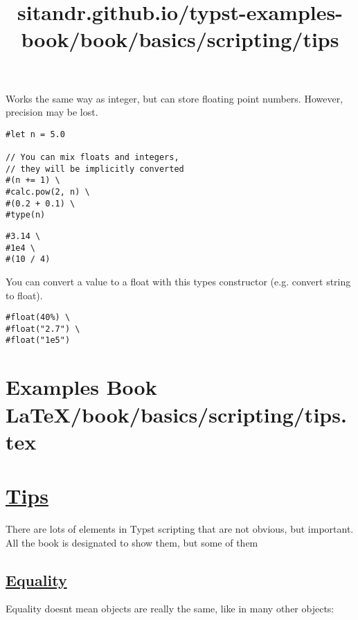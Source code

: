 Works the same way as integer, but can store floating point numbers.
However, precision may be lost.

\begin{verbatim}
#let n = 5.0

// You can mix floats and integers,
// they will be implicitly converted
#(n += 1) \
#calc.pow(2, n) \
#(0.2 + 0.1) \
#type(n)
\end{verbatim}

\pandocbounded{}

\begin{verbatim}
#3.14 \
#1e4 \
#(10 / 4)
\end{verbatim}

\pandocbounded{}

You can convert a value to a float with this type\textquotesingle s
constructor (e.g. convert string to float).

\begin{verbatim}
#float(40%) \
#float("2.7") \
#float("1e5")
\end{verbatim}

\pandocbounded{}


\section{Examples Book LaTeX/book/basics/scripting/tips.tex}
\title{sitandr.github.io/typst-examples-book/book/basics/scripting/tips}

\section{\texorpdfstring{\hyperref[tips]{Tips}}{Tips}}\label{tips}

There are lots of elements in Typst scripting that are not obvious, but
important. All the book is designated to show them, but some of them

\subsection{\texorpdfstring{\hyperref[equality]{Equality}}{Equality}}\label{equality}

Equality doesn\textquotesingle t mean objects are really the same, like
in many other objects:

